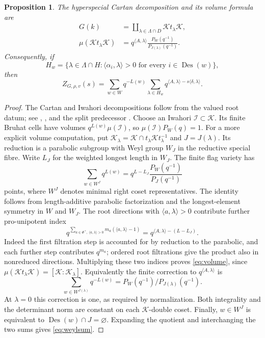 \documentclass[11pt,a4paper]{article}
\newtheorem{proposition}{Proposition}[section]
\theoremstyle{definition}
\newcommand{\Des}{\operatorname{Des}}
\begin{document}
\begin{proposition}\label{prop:cartan}
The hyperspecial Cartan decomposition and its volume formula are
\begin{align}
 G(k)&=\coprod_{\lambda\in\Lambda\cap D}\mathcal Kt_\lambda\mathcal K,
                                                       \label{eq:cartan}\\
 \mu(\mathcal Kt_\lambda\mathcal K)
  &=q^{\langle A,\lambda\rangle}
        \frac{P_W(q^{-1})}{P_{J(\lambda)}(q^{-1})}.        \label{eq:volume}
\end{align}
Consequently, if
\[
 H_w=\{\lambda\in\Lambda\cap H:
       \langle\alpha_i,\lambda\rangle>0\text{ for every }i\in\Des(w)\},
\]
then
\begin{equation}\label{eq:weylsum}
 Z_{G,\rho,v}(s)=
 \sum_{w\in W}q^{-L(w)}
       \sum_{\lambda\in H_w}
          q^{\langle A,\lambda\rangle-s\langle\delta,\lambda\rangle}.
\end{equation}
\end{proposition}
\begin{proof}
The Cartan and Iwahori decompositions follow from the valued root datum;
see \cite[\S3.3]{Tits}, \cite[\S4.4]{BT1}, and the split predecessor
\cite{IM}. Choose an Iwahori
$\mathcal I\subset\mathcal K$. Its finite Bruhat cells have volumes
$q^{L(w)}\mu(\mathcal I)$, so
$\mu(\mathcal I)P_W(q)=1$.
For a more explicit volume computation, put
$\mathcal K_\lambda=\mathcal K\cap
t_\lambda\mathcal Kt_\lambda^{-1}$ and $J=J(\lambda)$.
Its reduction is a parabolic subgroup with Weyl group $W_J$ in the
reductive special fibre. Write $L_J$ for the weighted longest length
in $W_J$. The finite flag variety has
\[
 \sum_{w\in W^J}q^{L(w)}
 =q^{L-L_J}\frac{P_W(q^{-1})}{P_J(q^{-1})}
\]
points, where $W^J$ denotes minimal right coset representatives.
The identity follows from length-additive parabolic factorization and
the longest-element symmetry in $W$ and $W_J$.
The root directions with $\langle a,\lambda\rangle>0$ contribute
further pro-unipotent index
\[
 q^{\sum_{a\in\Phi^+,\ \langle a,\lambda\rangle>0}
                 m_a(\langle a,\lambda\rangle-1)}
       =q^{\langle A,\lambda\rangle-(L-L_J)}.
\]
Indeed the first filtration step is accounted for by reduction to
the parabolic, and each further step contributes $q^{m_a}$;
ordered root filtrations give the product also in nonreduced directions.
Multiplying these two indices proves \eqref{eq:volume}, since
$\mu(\mathcal Kt_\lambda\mathcal K)=[\mathcal K:\mathcal K_\lambda]$.
Equivalently the finite correction to $q^{\langle A,\lambda\rangle}$ is
\[
 \sum_{w\in W^{J(\lambda)}}q^{-L(w)}
       =P_W(q^{-1})/P_{J(\lambda)}(q^{-1}).
\]
At $\lambda=0$ this correction is one, as required by normalization.
Both integrality and the determinant norm are constant on each
$\mathcal K$-double coset. Finally,
$w\in W^J$ is equivalent to $\Des(w)\cap J=\varnothing$.
Expanding the quotient and interchanging the two sums gives
\eqref{eq:weylsum}.
\end{proof}
\end{document}
